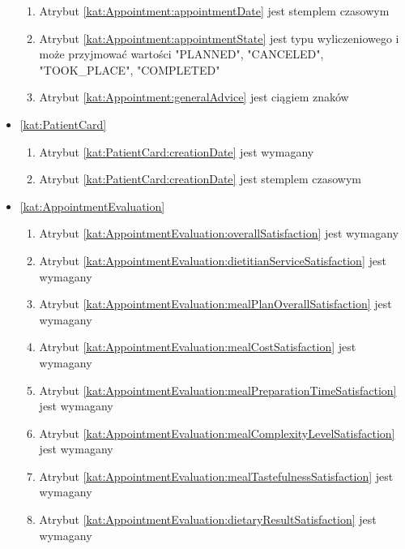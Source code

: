 \begin{itemize}[label={\textbf{Ograniczenia dla}}, wide, labelwidth=!, labelindent=0pt]
\begin{enumerate}[label={\textbf{OGR/\protect\threedigits{\arabic{enumi}}}}, wide, labelwidth=!, align=left, leftmargin=3cm, resume]
        \item Atrybut \ref{kat:Appointment:appointmentDate} jest stemplem czasowym
        \item Atrybut \ref{kat:Appointment:appointmentState} jest typu wyliczeniowego i może przyjmować wartości "PLANNED", "CANCELED", "TOOK\_PLACE", "COMPLETED"
        \item Atrybut \ref{kat:Appointment:generalAdvice} jest ciągiem znaków
    \end{enumerate}

    \item\ref{kat:PatientCard}
    \begin{enumerate}[label={\textbf{OGR/\protect\threedigits{\arabic{enumi}}}}, wide, labelwidth=!, align=left, leftmargin=3cm, resume]
        \item Atrybut \ref{kat:PatientCard:creationDate} jest wymagany

        \item Atrybut \ref{kat:PatientCard:creationDate} jest stemplem czasowym
    \end{enumerate}

    \item\ref{kat:AppointmentEvaluation}
    \begin{enumerate}[label={\textbf{OGR/\protect\threedigits{\arabic{enumi}}}}, wide, labelwidth=!, align=left, leftmargin=3cm, resume]
        \item Atrybut \ref{kat:AppointmentEvaluation:overallSatisfaction} jest wymagany
        \item Atrybut \ref{kat:AppointmentEvaluation:dietitianServiceSatisfaction} jest wymagany
        \item Atrybut \ref{kat:AppointmentEvaluation:mealPlanOverallSatisfaction} jest wymagany
        \item Atrybut \ref{kat:AppointmentEvaluation:mealCostSatisfaction} jest wymagany
        \item Atrybut \ref{kat:AppointmentEvaluation:mealPreparationTimeSatisfaction} jest wymagany
        \item Atrybut \ref{kat:AppointmentEvaluation:mealComplexityLevelSatisfaction} jest wymagany
        \item Atrybut \ref{kat:AppointmentEvaluation:mealTastefulnessSatisfaction} jest wymagany
        \item Atrybut \ref{kat:AppointmentEvaluation:dietaryResultSatisfaction} jest wymagany


\end{enumerate}
\end{itemize}
